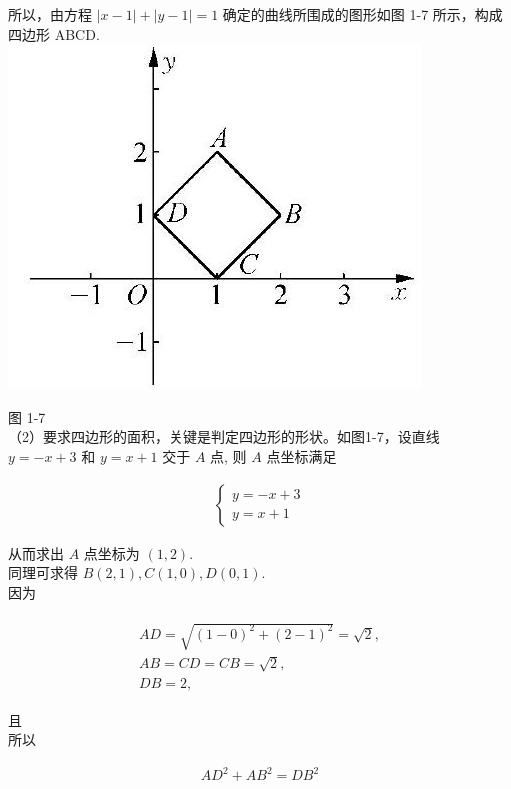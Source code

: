 \documentclass[10pt]{article}
\begin{document}
所以，由方程 $|x-1|+|y-1|=1$ 确定的曲线所围成的图形如图 1-7 所示，构成四边形 ABCD.\\
\includegraphics[max width=\textwidth, center]{2024_10_30_1bf34f7aeb61f11d11d3g-017(1)}

图 1-7\\
（2）要求四边形的面积，关键是判定四边形的形状。如图1-7，设直线 $y=-x+3$ 和 $y=x+1$ 交于 $A$ 点, 则 $A$ 点坐标满足

\begin{align*}
\left\{\begin{array}{l}
y=-x+3 \\
y=x+1
\end{array}\right.
\end{align*}

从而求出 $A$ 点坐标为 $(1,2)$.\\
同理可求得 $B(2,1), C(1,0), D(0,1)$.\\
因为

\begin{align*}
\begin{gathered}
A D=\sqrt{(1-0)^{2}+(2-1)^{2}}=\sqrt{2}, \\
A B=C D=C B=\sqrt{2}, \\
D B=2,
\end{gathered}
\end{align*}

且\\
所以

\begin{align*}
A D^{2}+A B^{2}=D B^{2}
\end{align*}
\end{document}
